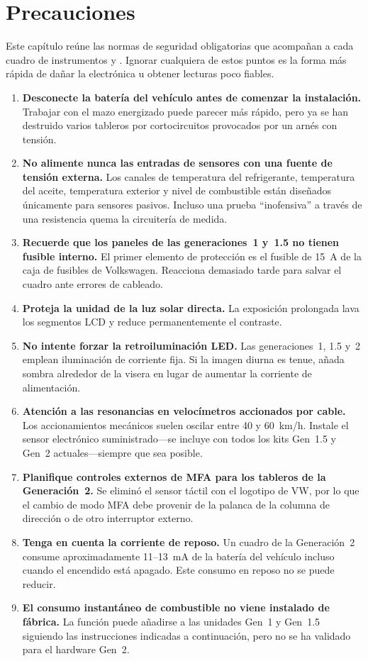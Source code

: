 \chapter{Precauciones}\label{ch:precautions}

Este capítulo reúne las normas de seguridad obligatorias que acompañan a cada cuadro de instrumentos \ReplicaGenOne{} y \ReplicaNextLong{}. Ignorar cualquiera de estos puntos es la forma más rápida de dañar la electrónica u obtener lecturas poco fiables.

\begin{enumerate}
    \item \textbf{Desconecte la batería del vehículo antes de comenzar la instalación.} Trabajar con el mazo energizado puede parecer más rápido, pero ya se han destruido varios tableros por cortocircuitos provocados por un arnés con tensión.
    \item \textbf{No alimente nunca las entradas de sensores con una fuente de tensión externa.} Los canales de temperatura del refrigerante, temperatura del aceite, temperatura exterior y nivel de combustible están diseñados únicamente para sensores pasivos. Incluso una prueba “inofensiva” a través de una resistencia quema la circuitería de medida.
    \item \textbf{Recuerde que los paneles de las generaciones~1 y~1.5 no tienen fusible interno.} El primer elemento de protección es el fusible de 15~A de la caja de fusibles de Volkswagen. Reacciona demasiado tarde para salvar el cuadro ante errores de cableado.
    \item \textbf{Proteja la unidad de la luz solar directa.} La exposición prolongada lava los segmentos LCD y reduce permanentemente el contraste.
    \item \textbf{No intente forzar la retroiluminación LED.} Las generaciones~1, 1.5 y~2 emplean iluminación de corriente fija. Si la imagen diurna es tenue, añada sombra alrededor de la visera en lugar de aumentar la corriente de alimentación.
    \item \textbf{Atención a las resonancias en velocímetros accionados por cable.} Los accionamientos mecánicos suelen oscilar entre 40 y 60~km/h. Instale el sensor electrónico suministrado---se incluye con todos los kits Gen~1.5 y Gen~2 actuales---siempre que sea posible.
    \item \textbf{Planifique controles externos de MFA para los tableros de la Generación~2.} Se eliminó el sensor táctil con el logotipo de VW, por lo que el cambio de modo MFA debe provenir de la palanca de la columna de dirección o de otro interruptor externo.
    \item \textbf{Tenga en cuenta la corriente de reposo.} Un cuadro de la Generación~2 consume aproximadamente 11--13~mA de la batería del vehículo incluso cuando el encendido está apagado. Este consumo en reposo no se puede reducir.
    \item \textbf{El consumo instantáneo de combustible no viene instalado de fábrica.} La función puede añadirse a las unidades Gen~1 y Gen~1.5 siguiendo las instrucciones indicadas a continuación, pero no se ha validado para el hardware Gen~2.
\end{enumerate}

